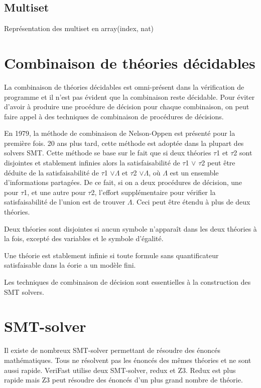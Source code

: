\documentclass[9pt]{book}
\newcommand{\verifast}{VeriFast}
\begin{document}
 		\subsection{Multiset}
 		Repr\'esentation des multiset en array(index, nat)

	
 	\section{Combinaison de th\'eories d\'ecidables}
 		La combinaison de th\'eories d\'ecidables est omni-pr\'esent dans la v\'erification de programme et il n'est pas \'evident que la combinaison reste d\'ecidable. Pour \'eviter d'avoir \`a produire une proc\'edure de d\'ecision pour chaque combinaison, on peut faire appel \`a des techniques de combinaison de proc\'edures de d\'ecisions.

 		En 1979, la m\'ethode de combinaison de Nelson-Oppen est pr\'esent\'e pour la premi\`ere fois. 20 ans plus tard, cette m\'ethode est adopt\'ee dans la plupart des solvers SMT. Cette m\'ethode se base sur le fait que si deux th\'eories $\tau$1 et $\tau$2 sont disjointes et stablement infinies alors la satisfaisabilit\'e de $\tau$1 $\lor$ $\tau$2 peut \^etre d\'eduite de la satisfaisabilit\'e de $\tau$1 $\lor \Lambda$ et $\tau$2 $\lor \Lambda$, o\`u $\Lambda$ est un ensemble d'informations partag\'ees. De ce fait, si on a deux proc\'edures de d\'ecision, une pour $\tau$1, et une autre pour $\tau$2, l'effort suppl\'ementaire pour v\'erifier la satisfaisabilit\'e de l'union est de trouver $\Lambda$. Ceci peut \^etre \'etendu \`a plus de deux th\'eories. \par
 		Deux th\'eories sont disjointes si aucun symbole n'appara\^it dans les deux th\'eories \`a la fois, except\'e des variables et le symbole d'\'egalit\'e. \par
 		Une th\'eorie est stablement infinie si toute formule sans quantificateur satisfaisable dans la \th\'eorie a un mod\`ele fini.

 		\par Les techniques de combinaison de d\'ecision sont essentielles \`a la construction des SMT solvers.

 	\section{SMT-solver}
 		Il existe de nombreux SMT-solver permettant de r\'esoudre des \'enonc\'es math\'ematiques. Tous ne r\'esolvent pas les \'enonc\'es des m\^emes th\'eories et ne sont aussi rapide. \verifast{} utilise deux SMT-solver, redux et Z3. Redux est plus rapide mais Z3 peut r\'esoudre des \'enonc\'es d'un plus grand nombre de th\'eorie.
\end{document}
